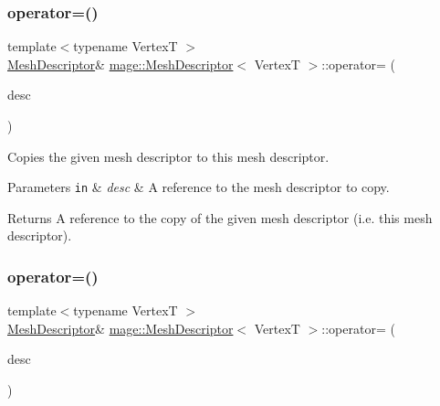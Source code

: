 \subsubsection{\texorpdfstring{operator=()}{operator=()}\hspace{0.1cm}{\footnotesize\ttfamily [1/2]}}
{\footnotesize\ttfamily template$<$typename VertexT $>$ \\
\hyperlink{structmage_1_1_mesh_descriptor}{Mesh\+Descriptor}\& \hyperlink{structmage_1_1_mesh_descriptor}{mage\+::\+Mesh\+Descriptor}$<$ VertexT $>$\+::operator= (\begin{DoxyParamCaption}\item[{const \hyperlink{structmage_1_1_mesh_descriptor}{Mesh\+Descriptor}$<$ VertexT $>$ \&}]{desc }\end{DoxyParamCaption})\hspace{0.3cm}{\ttfamily [default]}}

Copies the given mesh descriptor to this mesh descriptor.


\begin{DoxyParams}[1]{Parameters}
\mbox{\tt in}  & {\em desc} & A reference to the mesh descriptor to copy. \\
\hline
\end{DoxyParams}
\begin{DoxyReturn}{Returns}
A reference to the copy of the given mesh descriptor (i.\+e. this mesh descriptor). 
\end{DoxyReturn}
\hypertarget{structmage_1_1_mesh_descriptor_aee596eaa945924860d9a26daa58d8f45}{}\label{structmage_1_1_mesh_descriptor_aee596eaa945924860d9a26daa58d8f45} 
\subsubsection{\texorpdfstring{operator=()}{operator=()}\hspace{0.1cm}{\footnotesize\ttfamily [2/2]}}
{\footnotesize\ttfamily template$<$typename VertexT $>$ \\
\hyperlink{structmage_1_1_mesh_descriptor}{Mesh\+Descriptor}\& \hyperlink{structmage_1_1_mesh_descriptor}{mage\+::\+Mesh\+Descriptor}$<$ VertexT $>$\+::operator= (\begin{DoxyParamCaption}\item[{\hyperlink{structmage_1_1_mesh_descriptor}{Mesh\+Descriptor}$<$ VertexT $>$ \&\&}]{desc }\end{DoxyParamCaption})\hspace{0.3cm}{\ttfamily [default]}}

